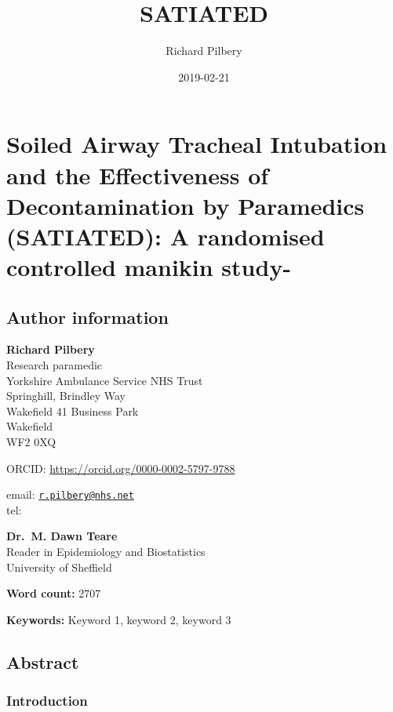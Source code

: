 \documentclass[]{article}
\title{SATIATED}
\author{Richard Pilbery}
\date{2019-02-21}
\begin{document}
\maketitle

\hypertarget{soiled-airway-tracheal-intubation-and-the-effectiveness-of-decontamination-by-paramedics-satiated-a-randomised-controlled-manikin-study-}{%
\section{Soiled Airway Tracheal Intubation and the Effectiveness of
Decontamination by Paramedics (SATIATED): A randomised controlled
manikin
study-}\label{soiled-airway-tracheal-intubation-and-the-effectiveness-of-decontamination-by-paramedics-satiated-a-randomised-controlled-manikin-study-}}

\hypertarget{author-information}{%
\subsection{Author information}\label{author-information}}

\textbf{Richard Pilbery}\\
Research paramedic\\
Yorkshire Ambulance Service NHS Trust\\
Springhill, Brindley Way\\
Wakefield 41 Business Park\\
Wakefield\\
WF2 0XQ

ORCID: \url{https://orcid.org/0000-0002-5797-9788}

email: \href{mailto:r.pilbery@nhs.net}{\nolinkurl{r.pilbery@nhs.net}}\\
tel:

\textbf{Dr.~M. Dawn Teare}\\
Reader in Epidemiology and Biostatistics\\
University of Sheffield

\textbf{Word count:} 2707

\textbf{Keywords:} Keyword 1, keyword 2, keyword 3

\hypertarget{abstract}{%
\subsection{Abstract}\label{abstract}}

\hypertarget{introduction}{%
\subsubsection{Introduction}\label{introduction}}
\end{document}
